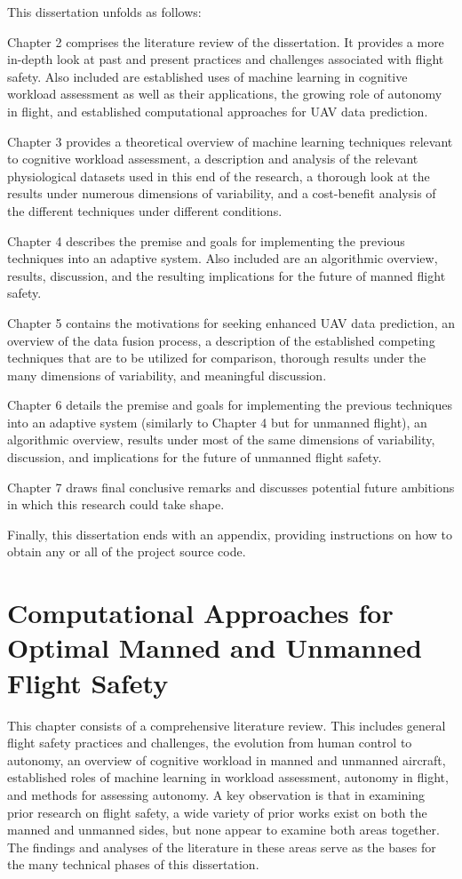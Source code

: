 \documentclass[12pt]{uthesis-v12}  %
\begin{document}
This dissertation unfolds as follows:

Chapter 2 comprises the literature review of the dissertation. It provides a more in-depth look at past and present practices and challenges associated with flight safety. Also included are established uses of machine learning in cognitive workload assessment as well as their applications, the growing role of autonomy in flight, and established computational approaches for UAV data prediction.

Chapter 3 provides a theoretical overview of machine learning techniques relevant to cognitive workload assessment, a description and analysis of the relevant physiological datasets used in this end of the research, a thorough look at the results under numerous dimensions of variability, and a cost-benefit analysis of the different techniques under different conditions.  

Chapter 4 describes the premise and goals for implementing the previous techniques into an adaptive system. Also included are an algorithmic overview, results, discussion, and the resulting implications for the future of manned flight safety.

Chapter 5 contains the motivations for seeking enhanced UAV data prediction, an overview of the data fusion process, a description of the established competing techniques that are to be utilized for comparison, thorough results under the many dimensions of variability, and meaningful discussion.

Chapter 6 details the premise and goals for implementing the previous techniques into an adaptive system (similarly to Chapter 4 but for unmanned flight), an algorithmic overview, results under most of the same dimensions of variability, discussion, and implications for the future of unmanned flight safety.

Chapter 7 draws final conclusive remarks and discusses potential future ambitions in which this research could take shape.

Finally, this dissertation ends with an appendix, providing instructions on how to obtain any or all of the project source code.


\chapter{Computational Approaches for Optimal Manned and Unmanned Flight Safety} 

This chapter consists of a comprehensive literature review. This includes general flight safety practices and challenges, the evolution from human control to autonomy, an overview of cognitive workload in manned and unmanned aircraft, established roles of machine learning in workload assessment, autonomy in flight, and methods for assessing autonomy. A key observation is that in examining prior research on flight safety, a wide variety of prior works exist on both the manned and unmanned sides, but none appear to examine both areas together. The findings and analyses of the literature in these areas serve as the bases for the many technical phases of this dissertation.
\end{document}
